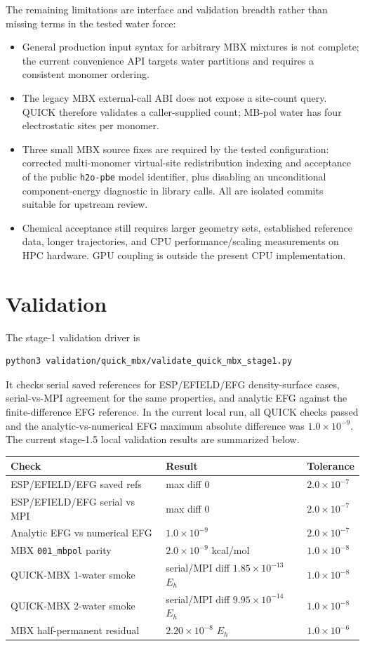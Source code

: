 \documentclass[11pt]{article}
\begin{document}
The remaining limitations are interface and validation breadth rather
than missing terms in the tested water force:
\begin{itemize}
  \item General production input syntax for arbitrary MBX mixtures is not
    complete; the current convenience API targets water partitions and
    requires a consistent monomer ordering.
  \item The legacy MBX external-call ABI does not expose a site-count query.
    QUICK therefore validates a caller-supplied count; MB-pol water has four
    electrostatic sites per monomer.
  \item Three small MBX source fixes are required by the tested configuration:
    corrected multi-monomer virtual-site redistribution indexing and
    acceptance of the public \texttt{h2o-pbe} model identifier, plus
    disabling an unconditional component-energy diagnostic in library
    calls. All are isolated commits suitable for upstream review.
  \item Chemical acceptance still requires larger geometry sets, established
    reference data, longer trajectories, and CPU performance/scaling
    measurements on HPC hardware. GPU coupling is outside the present CPU
    implementation.
\end{itemize}

\section{Validation}

The stage-1 validation driver is
\begin{verbatim}
python3 validation/quick_mbx/validate_quick_mbx_stage1.py
\end{verbatim}
It checks serial saved references for ESP/EFIELD/EFG density-surface cases,
serial-vs-MPI agreement for the same properties, and analytic EFG against
the finite-difference EFG reference. In the current local run, all QUICK
checks passed and the analytic-vs-numerical EFG maximum absolute difference
was $1.0\times 10^{-9}$. The current stage-1.5 local validation results
are summarized below.

\begin{tabular}{lll}
\toprule
Check & Result & Tolerance \\
\midrule
ESP/EFIELD/EFG saved refs & max diff $0$ & $2.0\times 10^{-7}$ \\
ESP/EFIELD/EFG serial vs MPI & max diff $0$ & $2.0\times 10^{-7}$ \\
Analytic EFG vs numerical EFG & $1.0\times 10^{-9}$ & $2.0\times 10^{-7}$ \\
MBX \texttt{001\_mbpol} parity & $2.0\times 10^{-9}$ kcal/mol & $1.0\times 10^{-8}$ \\
QUICK-MBX 1-water smoke & serial/MPI diff $1.85\times 10^{-13}$ $E_h$ & $1.0\times 10^{-8}$ \\
QUICK-MBX 2-water smoke & serial/MPI diff $9.95\times 10^{-14}$ $E_h$ & $1.0\times 10^{-8}$ \\
MBX half-permanent residual & $2.20\times 10^{-8}$ $E_h$ & $1.0\times 10^{-6}$ \\
\bottomrule
\end{tabular}
\end{document}
